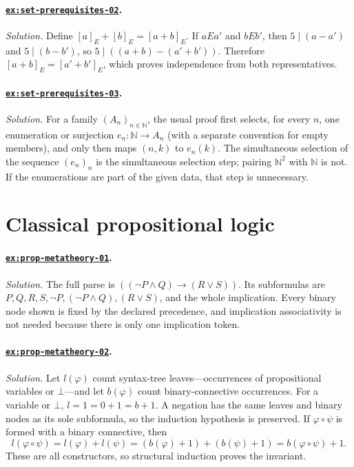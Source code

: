 \documentclass[11pt,oneside,openany]{book}
\theoremstyle{definition}
\theoremstyle{plain}
\theoremstyle{remark}
\newcommand{\N}{\mathbb{N}}
\newcommand{\bottom}{\bot}
\begin{document}
\paragraph{\hyperref[ex:set-prerequisites-02]{\texttt{ex:set-prerequisites-02}}.}
\textit{Solution.}  Define \([a]_E+[b]_E=[a+b]_E\).  If
\(aE a'\) and \(bE b'\), then \(5\mid(a-a')\) and \(5\mid(b-b')\), so
\(5\mid((a+b)-(a'+b'))\).  Therefore \([a+b]_E=[a'+b']_E\), which proves
independence from both representatives.

\paragraph{\hyperref[ex:set-prerequisites-03]{\texttt{ex:set-prerequisites-03}}.}
\textit{Solution.}  For a family \((A_n)_{n\in\N}\), the usual proof first
selects, for every \(n\), one enumeration or surjection
\(e_n:\N\to A_n\) (with a separate convention for empty members), and only
then maps \((n,k)\) to \(e_n(k)\).  The simultaneous selection of the sequence
\((e_n)_n\) is the simultaneous selection step; pairing \(\N^2\) with \(\N\) is not.  If the
enumerations are part of the given data, that step is unnecessary.

\section{Classical propositional logic}

\paragraph{\hyperref[ex:prop-metatheory-01]{\texttt{ex:prop-metatheory-01}}.}
\textit{Solution.}  The full parse is
\(((\neg P\land Q)\to(R\lor S))\).  Its subformulas are
\(P,Q,R,S,\neg P,(\neg P\land Q),(R\lor S)\), and the whole implication.
Every binary node shown is fixed by the declared precedence, and implication
associativity is not needed because there is only one implication token.

\paragraph{\hyperref[ex:prop-metatheory-02]{\texttt{ex:prop-metatheory-02}}.}
\textit{Solution.}  Let \(l(\varphi)\) count syntax-tree leaves---occurrences
of propositional variables or \(\bottom\)---and let \(b(\varphi)\) count
binary-connective occurrences.  For a variable or \(\bottom\),
\(l=1=0+1=b+1\).  A negation has the same leaves and binary nodes as its sole
subformula, so the induction hypothesis is preserved.  If
\(\varphi\circ\psi\) is formed with a binary connective, then
\[
l(\varphi\circ\psi)=l(\varphi)+l(\psi)
=(b(\varphi)+1)+(b(\psi)+1)
=b(\varphi\circ\psi)+1.
\]
These are all constructors, so structural induction proves the invariant.
\end{document}
